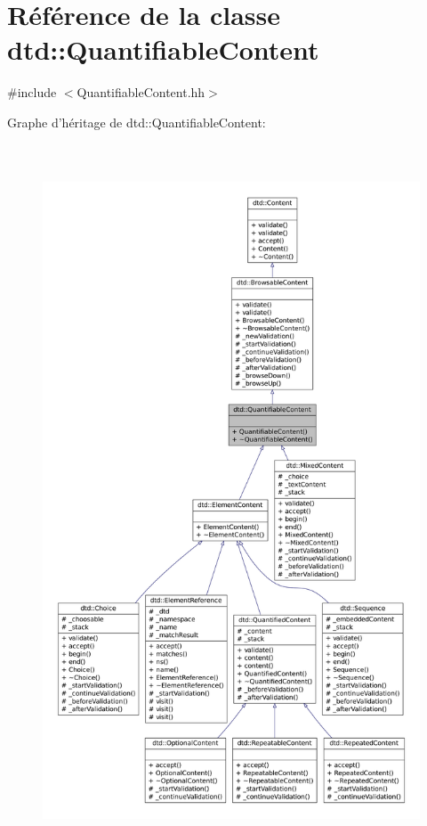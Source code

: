 \hypertarget{classdtd_1_1_quantifiable_content}{
\section{Référence de la classe dtd::QuantifiableContent}
\label{classdtd_1_1_quantifiable_content}
}


{\ttfamily \#include $<$QuantifiableContent.hh$>$}



Graphe d'héritage de dtd::QuantifiableContent:\nopagebreak
\begin{figure}[H]
\begin{center}
\leavevmode
\includegraphics[height=600pt]{classdtd_1_1_quantifiable_content__inherit__graph}
\end{center}
\end{figure}


